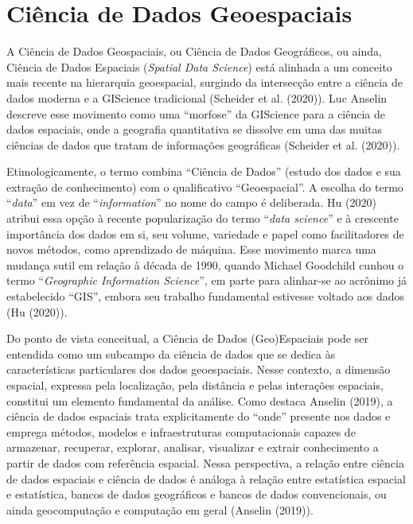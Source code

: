\documentclass[
  letterpaper,
  DIV=11,
  numbers=noendperiod]{scrreprt}
\begin{document}
\section{Ciência de Dados
Geoespaciais}\label{ciuxeancia-de-dados-geoespaciais}

A Ciência de Dados Geospaciais, ou Ciência de Dados Geográficos, ou
ainda, Ciência de Dados Espaciais (\emph{Spatial Data Science}) está
alinhada a um conceito mais recente na hierarquia geoespacial, surgindo
da intersecção entre a ciência de dados moderna e a GIScience
tradicional (Scheider et al. (2020)). Luc Anselin descreve esse
movimento como uma ``morfose'' da GIScience para a ciência de dados
espaciais, onde a geografia quantitativa se dissolve em uma das muitas
ciências de dados que tratam de informações geográficas (Scheider et al.
(2020)).

Etimologicamente, o termo combina ``Ciência de Dados'' (estudo dos dados
e sua extração de conhecimento) com o qualificativo ``Geoespacial''. A
escolha do termo ``\emph{data}'' em vez de ``\emph{information}'' no
nome do campo é deliberada. Hu (2020) atribui essa opção à recente
popularização do termo ``\emph{data science}'' e à crescente importância
dos dados em si, seu volume, variedade e papel como facilitadores de
novos métodos, como aprendizado de máquina. Esse movimento marca uma
mudança sutil em relação à década de 1990, quando Michael Goodchild
cunhou o termo ``\emph{Geographic Information Science}'', em parte para
alinhar-se ao acrônimo já estabelecido ``GIS'', embora seu trabalho
fundamental estivesse voltado aos dados (Hu (2020)).

Do ponto de vista conceitual, a Ciência de Dados (Geo)Espaciais pode ser
entendida como um subcampo da ciência de dados que se dedica às
características particulares dos dados geoespaciais. Nesse contexto, a
dimensão espacial, expressa pela localização, pela distância e pelas
interações espaciais, constitui um elemento fundamental da análise. Como
destaca Anselin (2019), a ciência de dados espaciais trata
explicitamente do ``onde'' presente nos dados e emprega métodos, modelos
e infraestruturas computacionais capazes de armazenar, recuperar,
explorar, analisar, visualizar e extrair conhecimento a partir de dados
com referência espacial. Nessa perspectiva, a relação entre ciência de
dados espaciais e ciência de dados é análoga à relação entre estatística
espacial e estatística, bancos de dados geográficos e bancos de dados
convencionais, ou ainda geocomputação e computação em geral (Anselin
(2019)).
\end{document}
